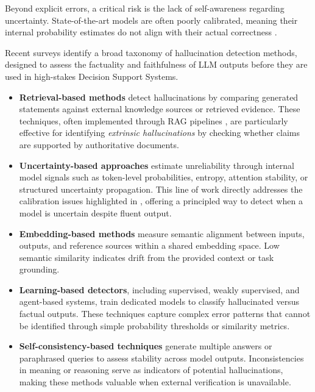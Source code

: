 Beyond explicit errors, a critical risk is the lack of self-awareness regarding uncertainty. State-of-the-art models are often poorly calibrated, meaning their internal probability estimates do not align with their actual correctness \cite{jiang2021can}.

Recent surveys \cite{alansari2025large} identify a broad taxonomy of hallucination detection methods, designed to assess the factuality and faithfulness of LLM outputs before they are used in high-stakes Decision Support Systems.

\begin{itemize}

    \item \textbf{Retrieval-based methods} detect hallucinations by comparing generated statements against external knowledge sources or retrieved evidence. These techniques, often implemented through RAG pipelines \cite{lewis2020retrieval}, are particularly effective for identifying \textit{extrinsic hallucinations} by checking whether claims are supported by authoritative documents.

    \item \textbf{Uncertainty-based approaches} estimate unreliability through internal model signals such as token-level probabilities, entropy, attention stability, or structured uncertainty propagation. This line of work directly addresses the calibration issues highlighted in \cite{jiang2021can}, offering a principled way to detect when a model is uncertain despite fluent output.

    \item \textbf{Embedding-based methods} measure semantic alignment between inputs, outputs, and reference sources within a shared embedding space. Low semantic similarity indicates drift from the provided context or task grounding.

    \item \textbf{Learning-based detectors}, including supervised, weakly supervised, and agent-based systems, train dedicated models to classify hallucinated versus factual outputs. These techniques capture complex error patterns that cannot be identified through simple probability thresholds or similarity metrics.

    \item \textbf{Self-consistency-based techniques} generate multiple answers or paraphrased queries to assess stability across model outputs. Inconsistencies in meaning or reasoning serve as indicators of potential hallucinations, making these methods valuable when external verification is unavailable.

\end{itemize}

